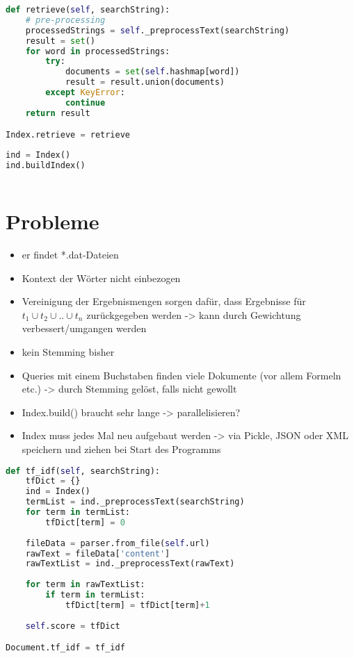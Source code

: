 \begin{lstlisting}[language=Python]
def retrieve(self, searchString):
    # pre-processing
    processedStrings = self._preprocessText(searchString)
    result = set()
    for word in processedStrings:
        try:
            documents = set(self.hashmap[word])
            result = result.union(documents)
        except KeyError:
            continue
    return result

Index.retrieve = retrieve
\end{lstlisting}

\begin{lstlisting}[language=Python]
ind = Index()
ind.buildIndex()
\end{lstlisting}

\begin{lstlisting}[language=Python]
\end{lstlisting}

\section{Probleme}\label{probleme}

\begin{itemize}
\item
  er findet *.dat-Dateien
\item
  Kontext der Wörter nicht einbezogen
\item
  Vereinigung der Ergebnismengen sorgen dafür, dass Ergebnisse für
  \(t_1 \cup t_2 \cup .. \cup t_n\) zurückgegeben werden -\textgreater{}
  kann durch Gewichtung verbessert/umgangen werden
\item
  kein Stemming bisher
\item
  Queries mit einem Buchstaben finden viele Dokumente (vor allem Formeln
  etc.) -\textgreater{} durch Stemming gelöst, falls nicht gewollt
\item
  Index.build() braucht sehr lange -\textgreater{} parallelisieren?
\item
  Index muss jedes Mal neu aufgebaut werden -\textgreater{} via Pickle,
  JSON oder XML speichern und ziehen bei Start des Programms
\end{itemize}

\begin{lstlisting}[language=Python]
def tf_idf(self, searchString):
    tfDict = {}
    ind = Index()
    termList = ind._preprocessText(searchString)
    for term in termList:
        tfDict[term] = 0
        
    fileData = parser.from_file(self.url)
    rawText = fileData['content']
    rawTextList = ind._preprocessText(rawText)
    
    for term in rawTextList:
        if term in termList:
            tfDict[term] = tfDict[term]+1
            
    self.score = tfDict

Document.tf_idf = tf_idf
\end{lstlisting}

